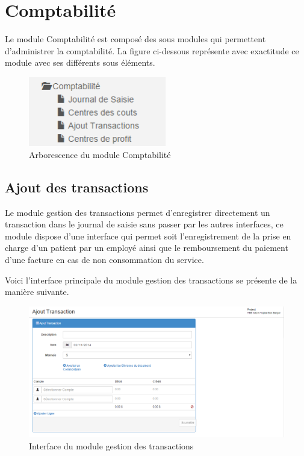 \documentclass[12pt,a4paper]{report}
\begin{document}
\newpage
\chapter{Comptabilité}        
Le module Comptabilité est composé des sous modules qui permettent d'administrer la comptabilité. La figure ci-dessous représente avec exactitude ce module avec ses différents sous éléments.

\begin{figure}[h]
\begin{center}
\includegraphics[width=6cm]{pic/ArboCompta.png}
\end{center}
\caption{Arborescence du module Comptabilité}
\label{Arborescence du module Comptabilité}
\end{figure}

\newpage
\section{Ajout des transactions}

Le module gestion des transactions permet d'enregistrer directement un transaction dans le journal de saisie sans passer par les autres interfaces, ce module dispose d'une interface qui permet soit l'enregistrement de la prise en charge d'un patient par un employé ainsi que le remboursement du paiement d'une facture en cas de non consommation du service.


Voici l'interface principale du module gestion des transactions se présente de la manière suivante. 
\begin{figure}[h]
\begin{center}
\includegraphics[width=12cm]{pic/AddTransaction.png}
\end{center}
\caption{Interface du module gestion des transactions}
\label{Interface du module gestion des transactions}
\end{figure}
\end{document}
